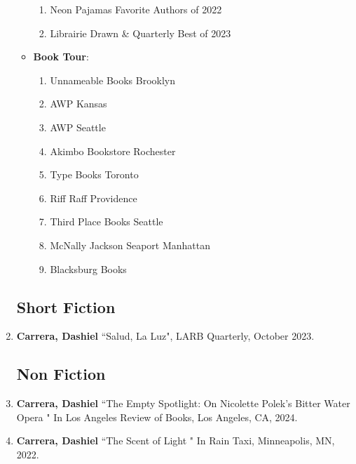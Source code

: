 \begin{enumerate}
\begin{itemize}
\begin{enumerate}
            \item Neon Pajamas Favorite Authors of 2022
            \item Librairie Drawn \& Quarterly Best of 2023
        \end{enumerate}
        \item \textbf{Book Tour}:
        \begin{enumerate}
            \item Unnameable Books Brooklyn
            \item AWP Kansas
            \item AWP Seattle
            \item Akimbo Bookstore Rochester
            \item Type Books Toronto
            \item Riff Raff Providence
            \item Third Place Books Seattle
            \item McNally Jackson Seaport Manhattan
            \item Blacksburg Books
        \end{enumerate}
    \end{itemize}

	
	
 
 
 
\subsection{Short Fiction}
\item \textbf{Carrera, Dashiel} ``Salud, La Luz", LARB Quarterly, October 2023. \\


\subsection{Non Fiction}

\item \textbf{Carrera, Dashiel} ``The Empty Spotlight: On Nicolette Polek's Bitter Water Opera " In Los Angeles Review of Books, Los Angeles, CA, 2024.\\
\item \textbf{Carrera, Dashiel} ``The Scent of Light " In Rain Taxi, Minneapolis, MN, 2022.\\



\end{enumerate}
